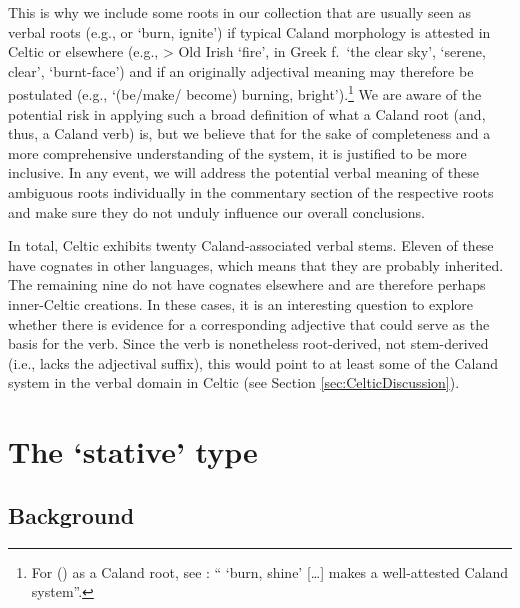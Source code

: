 \documentclass[output=paper,colorlinks,citecolor=brown]{langscibook}
\begin{document}
This is why we include some roots in our collection that are usually seen as verbal roots (e.g.,  or  ‘burn, ignite’) if typical Caland morphology   is attested in Celtic or elsewhere (e.g.,  > Old Irish  ‘fire’,  in Greek  f.\ ‘the clear sky’,  ‘serene, clear’,  ‘burnt-face’) and if an originally adjectival  meaning may therefore be postulated (e.g., ‘(be/make/ become) burning, bright’).\footnote{For  () as a Caland root, see \citet[35]{Nussbaum1976}: “ ‘burn, shine’ […] makes a well-attested Caland system”.} We are aware of the potential risk in applying such a broad definition of what a Caland root (and, thus, a Caland verb)   is, but we believe that for the sake of completeness and a more comprehensive understanding of the system, it is justified to be more inclusive. In any event, we will address the potential verbal meaning of these ambiguous roots individually in the commentary section of the respective roots and make sure they do not unduly influence our overall conclusions.

In total, Celtic exhibits twenty Caland-associated verbal stems.  Eleven of these have cognates in other languages, which means that they are probably inherited. The remaining nine do not have cognates elsewhere and are therefore perhaps inner-Celtic creations. In these cases, it is an interesting question to explore whether there is evidence for a corresponding adjective that could serve as the basis for the verb. Since the verb is nonetheless root-derived, not stem-derived (i.e., lacks the adjectival suffix), this would point to at least some  of the Caland system  in the verbal domain in Celtic (see Section   \ref{sec:CelticDiscussion}).

\section{The ‘stative’ type} 
\label{sec:Celticstative}

\subsection{Background}
\end{document}
